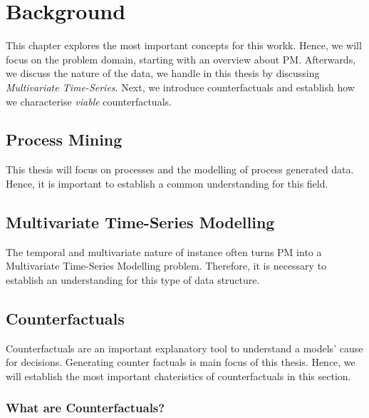 \documentclass[12pt,a4paper]{report}
\begin{document}
\chapter{Background}
\label{ch:prereq}
This chapter explores the most important concepts for this workk. Hence, we will focus on the problem domain, starting with an overview about \Gls{PM}. Afterwards, we discuss the nature of the data, we handle in this thesis by discussing \emph{Multivariate Time-Series}. Next, we introduce counterfactuals and establish how we characterise \emph{viable} counterfactuals. 

\section{Process Mining}
\label{sec:process}
This thesis will focus on processes and the modelling of process generated data. Hence, it is important to establish a common understanding for this field.


\section{Multivariate Time-Series Modelling}
\label{sec:sequences}
The temporal and multivariate nature of \gls{instance} often turns \Gls{PM} into a Multivariate Time-Series Modelling problem. Therefore, it is necessary to establish an understanding for this type of data structure.



\section{Counterfactuals}
\label{sec:counterfactuals}
Counterfactuals are an important explanatory tool to understand a models' cause for decisions. Generating counter factuals is main focus of this thesis. Hence, we will establish the most important chateristics of counterfactuals in this section.

\subsection{What are Counterfactuals?}


% 
\end{document}
